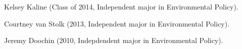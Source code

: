 \item Kelsey Kaline (Class of 2014, Independent major in Environmental Policy).
\item Courtney van Stolk (2013, Independent major in Environmental Policy).
\item Jeremy Doochin (2010, Indepdendent major in Environmental Policy).
